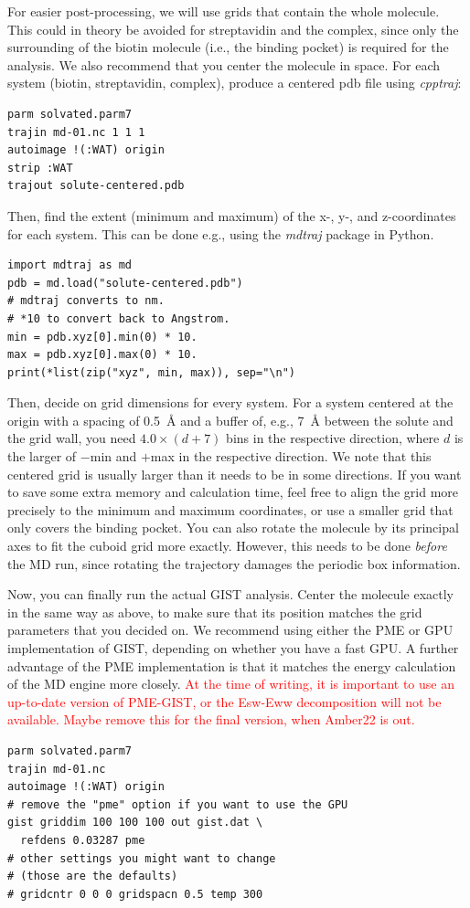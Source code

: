 \documentclass[9pt,tutorial]{livecoms}
\newcommand{\software}{\emph}
\newcommand{\todo}{\textcolor{red}}
\begin{document}
For easier post-processing, we will use grids that contain the whole molecule.
This could in theory be avoided for streptavidin and the complex, since only the surrounding of the biotin molecule (i.e., the binding pocket) is required for the analysis.
We also recommend that you center the molecule in space.
For each system (biotin, streptavidin, complex), produce a centered pdb file using \software{cpptraj}:
\begin{lstlisting}
parm solvated.parm7
trajin md-01.nc 1 1 1
autoimage !(:WAT) origin
strip :WAT
trajout solute-centered.pdb
\end{lstlisting}
Then, find the extent (minimum and maximum) of the x-, y-, and z-coordinates for each system.
This can be done e.g., using the \software{mdtraj} package in Python.
\begin{lstlisting}[style=python]
import mdtraj as md
pdb = md.load("solute-centered.pdb")
# mdtraj converts to nm.
# *10 to convert back to Angstrom.
min = pdb.xyz[0].min(0) * 10.
max = pdb.xyz[0].max(0) * 10.
print(*list(zip("xyz", min, max)), sep="\n")
\end{lstlisting}
Then, decide on grid dimensions for every system.
For a system centered at the origin with a spacing of \SI{0.5}{\angstrom} and a buffer of, e.g., \SI{7}{\angstrom} between the solute and the grid wall, you need $4.0\times (d+7)$ bins in the respective direction, where $d$ is the larger of $-$min and $+$max in the respective direction.
We note that this centered grid is usually larger than it needs to be in some directions.
If you want to save some extra memory and calculation time, feel free to align the grid more precisely to the minimum and maximum coordinates, or use a smaller grid that only covers the binding pocket.
You can also rotate the molecule by its principal axes to fit the cuboid grid more exactly.
However, this needs to be done \emph{before} the MD run, since rotating the trajectory damages the periodic box information.

Now, you can finally run the actual GIST analysis. Center the molecule exactly in the same way as above, to make sure that its position matches the grid parameters that you decided on.
We recommend using either the PME or GPU implementation of GIST, depending on whether you have a fast GPU.
A further advantage of the PME implementation is that it matches the energy calculation of the MD engine more closely.
\todo{At the time of writing, it is important to use an up-to-date version of PME-GIST, or the Esw-Eww decomposition will not be available. Maybe remove this for the final version, when Amber22 is out.}
\begin{lstlisting}
parm solvated.parm7
trajin md-01.nc
autoimage !(:WAT) origin
# remove the "pme" option if you want to use the GPU
gist griddim 100 100 100 out gist.dat \
  refdens 0.03287 pme
# other settings you might want to change
# (those are the defaults)
# gridcntr 0 0 0 gridspacn 0.5 temp 300
\end{lstlisting}
\end{document}
